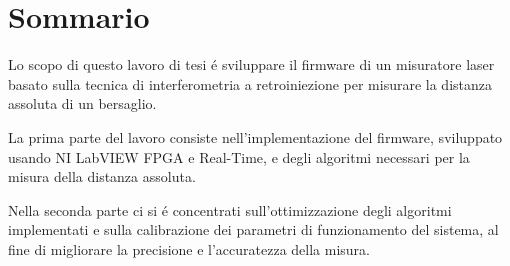 \newpage
\chapter*{Sommario}

Lo scopo di questo lavoro di tesi \'e sviluppare il firmware di un misuratore laser basato sulla tecnica di interferometria a retroiniezione per misurare la distanza assoluta di un bersaglio.

La prima parte del lavoro consiste nell'implementazione del firmware, sviluppato usando NI LabVIEW FPGA e Real-Time, e degli algoritmi necessari per la misura della distanza assoluta.

Nella seconda parte ci si \'e concentrati sull'ottimizzazione degli algoritmi implementati e sulla calibrazione dei parametri di funzionamento del sistema, al fine di migliorare la precisione e l'accuratezza della misura.
